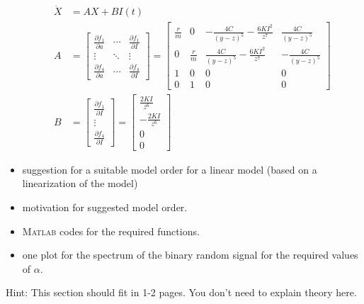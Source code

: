 \documentclass[10pt,a4paper]{article}
\begin{document}
\begin{itemize}
\begin{align*}
		\dot{X} &= A X + B I(t) \\
		A &= \begin{bmatrix} \frac{\partial f_{1}}{\partial a} & \cdots & \frac{\partial f_{1}}{\partial I} \\ \vdots & \ddots & \vdots \\ \frac{\partial f_{4}}{\partial a} & \cdots & \frac{\partial f_{4}}{\partial I} \end{bmatrix} = \begin{bmatrix} \frac{r}{m} & 0 & - \frac{4 C}{(y - z)^{5}} - \frac{6 K I^{2}}{z^{7}} & \frac{4 C}{(y - z)^{5}} \\ 0 & \frac{r}{m} & \frac{4 C}{(y - z)^{5}} - \frac{6 K I^{2}}{z^{7}} & - \frac{4 C}{(y - z)^{5}} \\ 1 & 0 & 0 & 0 \\ 0 & 1 & 0 & 0 \end{bmatrix} \\ 
		B &= \begin{bmatrix} \frac{\partial f_{1}}{\partial I} \\ \vdots \\ \frac{\partial f_{4}}{\partial I} \end{bmatrix} = \begin{bmatrix} \frac{2 K I}{z^{6}} \\ - \frac{2 K I}{z^{6}} \\ 0 \\ 0 \end{bmatrix}
	\end{align*}
    \item suggestion for a suitable model order for a linear model (based on a linearization of the model)
    \item motivation for suggested model order.
    \item \textsc{Matlab} codes for the required functions.
    \item one plot for the spectrum of the binary random signal for the required values of $\alpha$.
\end{itemize}
Hint: This section should fit in 1-2 pages. You don't need to explain theory here.

\end{document}
